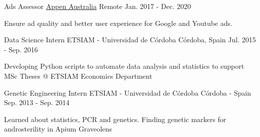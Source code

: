 

\begin{cventries}

  \cventry
    {Ads Assessor}
    {\href{https://appen.com/}{Appen Australia}}
    {Remote}
    {Jan. 2017 - Dec. 2020}
     {
      \begin{cvitems}
        \item {Ensure ad quality and better user experience for Google and Youtube ads.}
      \end{cvitems}
    }

  \cventry
    {Data Science Intern}
    {ETSIAM - Universidad de Córdoba}
    {Córdoba, Spain}
    {Jul. 2015 - Sep. 2016}
     {
      \begin{cvitems}
        \item {Developing Python scripts to automate data analysis and statistics to support MSc Theses @ ETSIAM Economics Department}
      \end{cvitems}
    }

  \cventry
    {Genetic Engineering Intern}
    {ETSIAM - Universidad de Córdoba}
    {Córdoba - Spain}
    {Sep. 2013 - Sep. 2014}
     {
      \begin{cvitems}
        \item {Learned about statistics, PCR and genetics. Finding genetic markers for androsterility in Apium Graveolens}
      \end{cvitems}
    }

\end{cventries}
